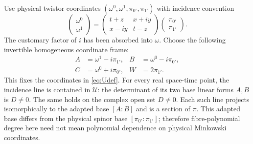 \documentclass[aps,prd,reprint,nofootinbib,superscriptaddress]{revtex4-2}
\theoremstyle{definition}
\theoremstyle{remark}
\newcommand{\cU}{\mathcal{U}}
\begin{document}
Use physical twistor coordinates $(\omega^0,\omega^1,\pi_{0'},\pi_{1'})$ with incidence convention
\begin{equation}
\begin{pmatrix}\omega^0\\\omega^1\end{pmatrix}
=\begin{pmatrix}t+z&x+iy\\x-iy&t-z\end{pmatrix}
\begin{pmatrix}\pi_{0'}\\\pi_{1'}\end{pmatrix}.
\label{eq:physicalIncidence}
\end{equation}
The customary factor of $i$ has been absorbed into $\omega$. Choose the following invertible homogeneous coordinate frame:
\begin{align}
A&=\omega^1-i\pi_{1'},&B&=\omega^0-i\pi_{0'},\nonumber\\
C&=\omega^0+i\pi_{0'},&W&=2\pi_{1'}.
\label{eq:adaptedTwistors}
\end{align}
This fixes the coordinates in \eqref{eq:Udef}. For every real space-time point, the incidence line is contained in $\cU$: the determinant of its two base linear forms $A,B$ is $D\ne0$. The same holds on the complex open set $D\ne0$. Each such line projects isomorphically to the adapted base $[A:B]$ and is a section of $\pi$. This adapted base differs from the physical spinor base $[\pi_{0'}:\pi_{1'}]$; therefore fibre-polynomial degree here need not mean polynomial dependence on physical Minkowski coordinates.
\end{document}
